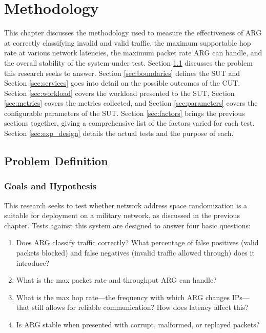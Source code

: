 \chapter{Methodology}
\label{chp:methodology}

\par This chapter discusses the methodology used to measure the effectiveness of \ac{ARG} at correctly classifying invalid and valid traffic, the maximum supportable hop rate at various network latencies, the maximum packet rate \ac{ARG} can handle, and the overall stability of the system under test. Section \ref{sec:problem_def} discusses the problem this research seeks to answer. Section \ref{sec:boundaries} defines the \ac{SUT} and Section \ref{sec:services} goes into detail on the possible outcomes of the \ac{CUT}. Section \ref{sec:workload} covers the workload presented to the \ac{SUT}, Section \ref{sec:metrics} covers the metrics collected, and Section \ref{sec:parameters} covers the configurable parameters of the \ac{SUT}. Section \ref{sec:factors} brings the previous sections together, giving a comprehensive list of the factors varied for each test. Section \ref{sec:exp_design} details the actual tests and the purpose of each.

\section{Problem Definition}
\label{sec:problem_def}
\subsection{Goals and Hypothesis}
\label{sec:goals}
\par This research seeks to test whether network address space randomization is a suitable for deployment on a military network, as discussed in the previous chapter. Tests against this system are designed to answer four basic questions:

\begin{enumerate}
\item Does \ac{ARG} classify traffic correctly? What percentage of false positives (valid packets blocked) and false negatives (invalid traffic allowed through) does it introduce?
\item What is the max packet rate and throughput \ac{ARG} can handle?
\item What is the max hop rate---the frequency with which \ac{ARG} changes \acp{IP}---that still allows for reliable communication? How does latency affect this?
\item Is \ac{ARG} stable when presented with corrupt, malformed, or replayed packets?
\end{enumerate}

